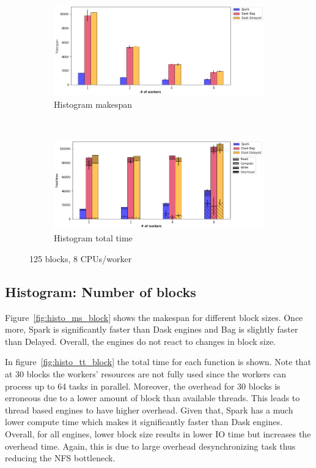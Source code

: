 \documentclass[conference]{IEEEtran}
\begin{document}
\begin{figure}[!b]
    \centering
    \begin{subfigure}[b]{\columnwidth}
        \includegraphics[clip,width=\columnwidth]{images/histo_worker.png}%
        \caption{Histogram makespan}\label{fig:histo_ms_worker}
    \end{subfigure}
    \\
    \begin{subfigure}[b]{\columnwidth}
        \includegraphics[clip,width=\columnwidth]{images/histo_idle_worker.png}%
        \caption{Histogram total time}\label{fig:histo_tt_worker}
    \end{subfigure}
    \caption{125 blocks, 8 CPUs/worker}
\end{figure}

\subsection{Histogram: Number of blocks}
Figure~\ref{fig:histo_ms_block} shows the makespan for different block sizes. 
Once more, Spark is significantly faster than Dask engines and Bag is slightly
faster than Delayed. Overall, the engines do not react to changes in block size.

In figure~\ref{fig:histo_tt_block} the total time for each function is shown.
Note that at 30 blocks the workers' resources are not fully used since the
workers can process up to 64 tasks in parallel. Moreover, the overhead for
30 blocks is erroneous due to a lower amount of block than available threads.
This leads to thread based engines to have higher overhead. Given that, 
Spark has a much lower compute time which makes it significantly faster
than Dask engines. Overall, for all engines, lower block size results in lower
IO time but increases the overhead time. Again, this is due to large overhead
desynchronizing task thus reducing the NFS bottleneck.
\end{document}
